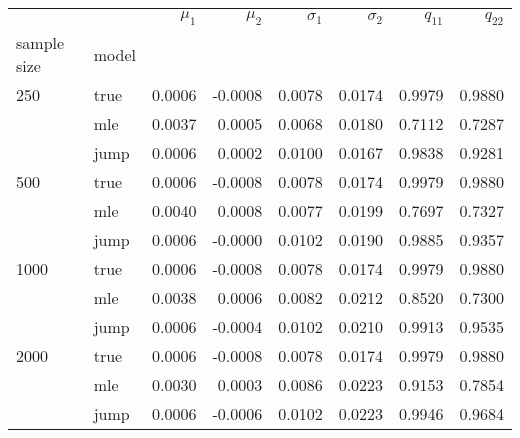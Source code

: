 \begin{tabular}{llrrrrrr}
\toprule
     &      &  $\mu_1$ &  $\mu_2$ &  $\sigma_1$ &  $\sigma_2$ &  $q_{11}$ &  $q_{22}$ \\
sample size & model &          &          &             &             &           &           \\
\midrule
250  & true &   0.0006 &  -0.0008 &      0.0078 &      0.0174 &    0.9979 &    0.9880 \\
     & mle &   0.0037 &   0.0005 &      0.0068 &      0.0180 &    0.7112 &    0.7287 \\
     & jump &   0.0006 &   0.0002 &      0.0100 &      0.0167 &    0.9838 &    0.9281 \\
500  & true &   0.0006 &  -0.0008 &      0.0078 &      0.0174 &    0.9979 &    0.9880 \\
     & mle &   0.0040 &   0.0008 &      0.0077 &      0.0199 &    0.7697 &    0.7327 \\
     & jump &   0.0006 &  -0.0000 &      0.0102 &      0.0190 &    0.9885 &    0.9357 \\
1000 & true &   0.0006 &  -0.0008 &      0.0078 &      0.0174 &    0.9979 &    0.9880 \\
     & mle &   0.0038 &   0.0006 &      0.0082 &      0.0212 &    0.8520 &    0.7300 \\
     & jump &   0.0006 &  -0.0004 &      0.0102 &      0.0210 &    0.9913 &    0.9535 \\
2000 & true &   0.0006 &  -0.0008 &      0.0078 &      0.0174 &    0.9979 &    0.9880 \\
     & mle &   0.0030 &   0.0003 &      0.0086 &      0.0223 &    0.9153 &    0.7854 \\
     & jump &   0.0006 &  -0.0006 &      0.0102 &      0.0223 &    0.9946 &    0.9684 \\
\bottomrule
\end{tabular}
